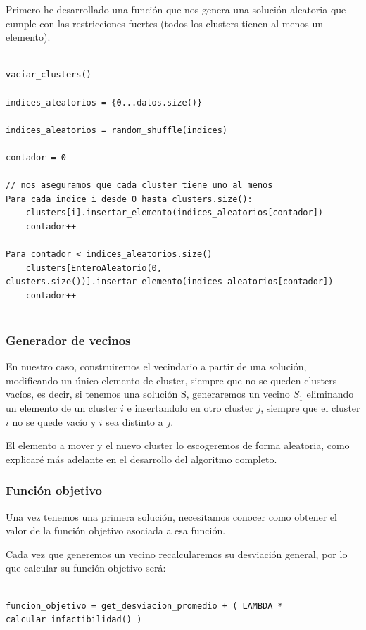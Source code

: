 \documentclass[12pt, spanish]{article}
\begin{document}
 Primero he desarrollado una función que nos genera una solución aleatoria que cumple con las restricciones fuertes (todos los clusters tienen al menos un elemento).
 
 \begin{lstlisting}

vaciar_clusters()

indices_aleatorios = {0...datos.size()}

indices_aleatorios = random_shuffle(indices)

contador = 0

// nos aseguramos que cada cluster tiene uno al menos
Para cada indice i desde 0 hasta clusters.size():
	clusters[i].insertar_elemento(indices_aleatorios[contador])
	contador++
	
Para contador < indices_aleatorios.size()
	clusters[EnteroAleatorio(0, clusters.size())].insertar_elemento(indices_aleatorios[contador])
	contador++
	

\end{lstlisting}
 
 
\subsubsection{Generador de vecinos}

En nuestro caso, construiremos el vecindario a partir de una solución, modificando un único elemento de cluster, siempre que no se queden clusters vacíos, es decir, si tenemos una solución S, generaremos un vecino $S_1$ eliminando un elemento de un cluster $i$ e insertandolo en otro cluster $j$, siempre que el cluster $i$ no se quede vacío y $i$ sea distinto a $j$.

El elemento a mover y el nuevo cluster lo escogeremos de forma aleatoria, como explicaré más adelante en el desarrollo del algoritmo completo.

 
\subsubsection{Función objetivo} 
 
Una vez tenemos una primera solución, necesitamos conocer como obtener el valor de la función objetivo asociada a esa función.

Cada vez que generemos un vecino recalcularemos su desviación general, por lo que calcular su función objetivo será:

\begin{lstlisting}

funcion_objetivo = get_desviacion_promedio + ( LAMBDA * calcular_infactibilidad() )

 \end{lstlisting}
\end{document}
